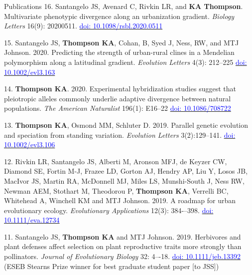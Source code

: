 \documentclass[11pt]{article}
\begin{document}
\begin{rSection}{Publications}
\noindent\hspace{.1cm}16. Santangelo JS, Avenard C, Rivkin LR, and \textbf{KA Thompson}. Multivariate phenotypic divergence along an urbanization gradient. \textit{Biology Letters} 16(9): 20200511. \href{https://doi.org/10.1098/rsbl.2020.0511}{\textcolor{blue}{doi: 10.1098/rsbl.2020.0511}}

\noindent\hspace{.1cm}15. Santangelo JS, \textbf{Thompson KA}, Cohan, B, Syed J, Ness, RW, and MTJ Johnson. 2020. Predicting the strength of urban-rural clines in a Mendelian polymorphism along a latitudinal gradient. \textit{Evolution Letters} 4(3): 212--225 \href{https://doi.org/10.1002/evl3.163}{\textcolor{blue}{doi: 10.1002/evl3.163}}

\noindent\hspace{.1cm}14. \textbf{Thompson KA}. 2020. Experimental hybridization studies suggest that pleiotropic alleles commonly underlie adaptive divergence between natural populations. \textit{The American Naturalist} 196(1): E16--22 \href{https://doi.org/10.1086/708722}{\textcolor{blue}{doi: 10.1086/708722}}


\noindent\hspace{.1cm}13. \textbf{Thompson KA}, Osmond MM, Schluter D. 2019. Parallel genetic evolution and speciation from standing variation. \textit{Evolution Letters} 3(2):129--141. \href{https://doi.org/10.1002/evl3.106}{\textcolor{blue}{doi: 10.1002/evl3.106}}

\noindent\hspace{.1cm}12. Rivkin LR, Santangelo JS, Alberti M, Aronson MFJ, de Keyzer CW, Diamond SE, Fortin M-J, Frazee LD, Gorton AJ, Hendry AP, Liu Y, Losos JB, MacIvor JS, Martin RA, McDonnell MJ, Miles LS, Munshi-South J, Ness RW, Newman AEM, Stothart M, Theodorou P, \textbf{Thompson KA}, Verrelli BC, Whitehead A, Winchell KM and MTJ Johnson. 2019. A roadmap for urban evolutionary ecology. \textit{Evolutionary Applications} 12(3): 384-–398. \href{https://doi.org/10.1111/eva.12734}{\textcolor{blue}{doi: 10.1111/eva.12734}}

\noindent\hspace{.1cm}11. Santangelo JS, \textbf{Thompson KA} and MTJ Johnson. 2019. Herbivores and plant defenses affect selection on plant reproductive traits more strongly than pollinators. \textit{Journal of Evolutionary Biology} 32: 4–-18. \href{https://doi.org/10.1111/jeb.13392}{\textcolor{blue}{doi: 10.1111/jeb.13392}} \\
(ESEB Stearns Prize winner for best graduate student paper [to JSS])


\end{rSection}
\end{document}
